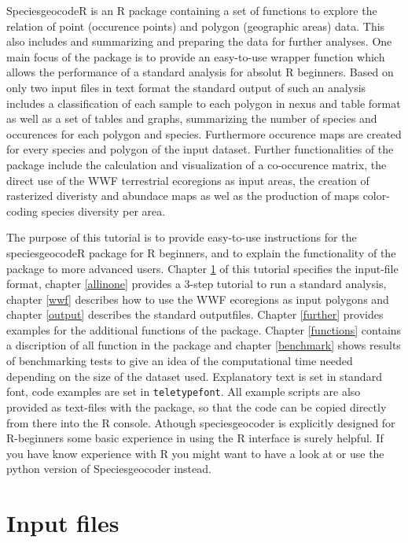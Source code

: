 \documentclass[a4paper,titlepage,11pt]{scrreprt}
\begin{document}
SpeciesgeocodeR is an R package containing a set of functions to explore the relation of point (occurence points) and polygon (geographic areas) data. This also includes and summarizing and preparing the data for further analyses. One main focus of the package is to provide an easy-to-use wrapper function which allows the performance of a standard analysis for absolut R beginners. Based on only two input files in text format the standard output of such an analysis includes a classification of each sample to each polygon in nexus and table format as well as a set of tables and graphs, summarizing the number of species and occurences for each polygon and species. Furthermore occurence maps are created for every species and polygon of the input dataset. Further functionalities of the package include the calculation and visualization of a co-occurence matrix, the direct use of the WWF terrestrial ecoregions as input areas, the creation of rasterized diveristy and abundace maps as wel as the production of maps color-coding species diversity per area.

The purpose of this tutorial is to provide easy-to-use instructions for the speciesgeocodeR package for R beginners, and to explain the functionality of the package to more advanced users. Chapter \ref{input} of this tutorial specifies the input-file format, chapter \ref{allinone} provides a 3-step tutorial to run a standard analysis, chapter  \ref{wwf} describes how to use the WWF ecoregions as input polygons and chapter  \ref{output} describes the standard outputfiles. Chapter \ref{further} provides examples for the additional functions of the package. Chapter \ref{functions} contains a discription of all function in the package and chapter \ref{benchmark} shows results of benchmarking tests to give an idea of the computational time needed depending on the size of the dataset used. Explanatory text is set in standard font, code examples are set in \texttt{teletypefont}.  All example scripts are also provided as text-files with the package, so that the code can be copied directly from there into the R console. Athough speciesgeocoder is explicitly designed for R-beginners some basic experience in using the R interface is surely helpful. If you have know experience with R you might want to have a look at \citet{Crwaly2000} or use the python version of Speciesgeocoder \citep{XXX} instead.

\chapter{Input files} \label{input}
\end{document}
